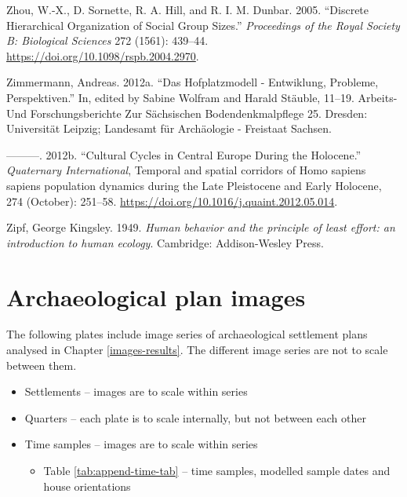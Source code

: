 \documentclass[
  12pt,
  a4paper, twoside]{book}
\providecommand{\tightlist}{%
  \setlength{\itemsep}{0pt}\setlength{\parskip}{0pt}}
\newlength{\cslhangindent}
\newlength{\cslentryspacingunit} %
\newenvironment{CSLReferences}[2] %
 {%
  \setlength{\parindent}{0pt}
  \ifodd #1
  \let\oldpar\par
  \def\par{\hangindent=\cslhangindent\oldpar}
  \fi
  \setlength{\parskip}{#2\cslentryspacingunit}
 }%
 {}
\begin{document}
\begin{CSLReferences}{1}{0}
\leavevmode{}%
Zhou, W.-X., D. Sornette, R. A. Hill, and R. I. M. Dunbar. 2005. {``Discrete Hierarchical Organization of Social Group Sizes.''} \emph{Proceedings of the Royal Society B: Biological Sciences} 272 (1561): 439--44. \url{https://doi.org/10.1098/rspb.2004.2970}.

\leavevmode{}%
Zimmermann, Andreas. 2012a. {``Das Hofplatzmodell - Entwiklung, Probleme, Perspektiven.''} In, edited by Sabine Wolfram and Harald Stäuble, 11--19. Arbeits- Und Forschungsberichte Zur Sächsischen Bodendenkmalpflege 25. Dresden: Universität Leipzig; Landesamt für Archäologie - Freistaat Sachsen.

\leavevmode{}%
---------. 2012b. {``Cultural Cycles in {Central Europe} During the {Holocene}.''} \emph{Quaternary International}, Temporal and spatial corridors of {Homo} sapiens sapiens population dynamics during the {Late Pleistocene} and {Early Holocene}, 274 (October): 251--58. \url{https://doi.org/10.1016/j.quaint.2012.05.014}.

\leavevmode{}%
Zipf, George Kingsley. 1949. \emph{Human behavior and the principle of least effort: an introduction to human ecology}. Cambridge: Addison-Wesley Press.

\end{CSLReferences}

\hypertarget{appendix-appendix}{%
\appendix {}}


\hypertarget{append-archaeo}{%
\chapter{Archaeological plan images}\label{append-archaeo}}

The following plates include image series of archaeological settlement plans analysed in Chapter \ref{images-results}. The different image series are not to scale between them.

\begin{itemize}
\item
  Settlements -- images are to scale within series
\item
  Quarters -- each plate is to scale internally, but not between each other
\item
  Time samples -- images are to scale within series

  \begin{itemize}
  \tightlist
  \item
    Table \ref{tab:append-time-tab} -- time samples, modelled sample dates and house orientations
  \end{itemize}
\end{itemize}
\end{document}
